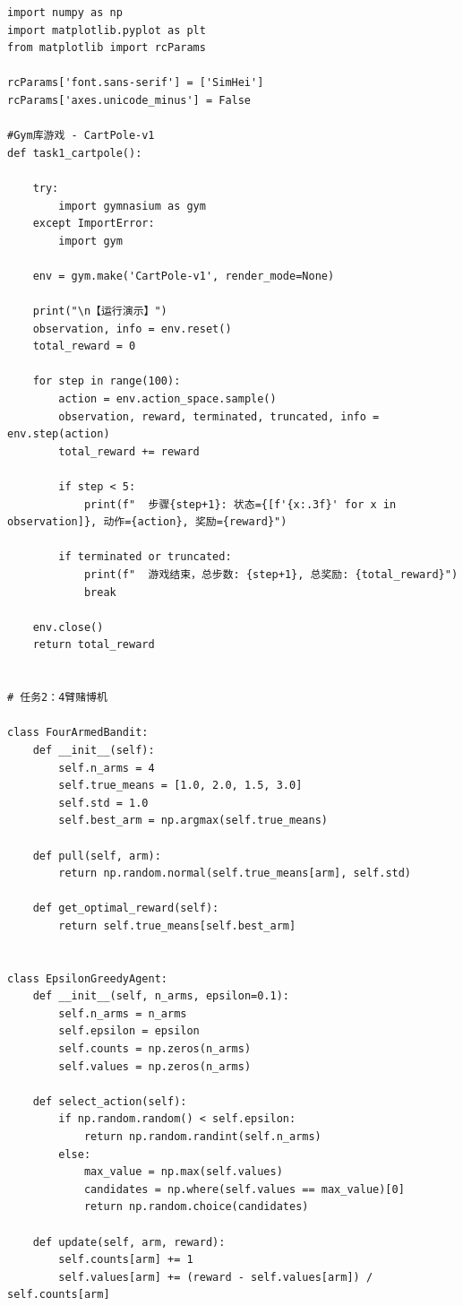 \documentclass[12pt,a4paper]{article}
\begin{document}
\begin{lstlisting}[caption={强化学习实验完整代码}]
import numpy as np
import matplotlib.pyplot as plt
from matplotlib import rcParams

rcParams['font.sans-serif'] = ['SimHei']
rcParams['axes.unicode_minus'] = False

#Gym库游戏 - CartPole-v1
def task1_cartpole():

    try:
        import gymnasium as gym
    except ImportError:
        import gym
    
    env = gym.make('CartPole-v1', render_mode=None)
   
    print("\n【运行演示】")
    observation, info = env.reset()
    total_reward = 0
    
    for step in range(100):
        action = env.action_space.sample()
        observation, reward, terminated, truncated, info = env.step(action)
        total_reward += reward
        
        if step < 5:
            print(f"  步骤{step+1}: 状态={[f'{x:.3f}' for x in observation]}, 动作={action}, 奖励={reward}")
        
        if terminated or truncated:
            print(f"  游戏结束，总步数: {step+1}, 总奖励: {total_reward}")
            break
    
    env.close()
    return total_reward


# 任务2：4臂赌博机

class FourArmedBandit:
    def __init__(self):
        self.n_arms = 4
        self.true_means = [1.0, 2.0, 1.5, 3.0]
        self.std = 1.0
        self.best_arm = np.argmax(self.true_means)
    
    def pull(self, arm):
        return np.random.normal(self.true_means[arm], self.std)
    
    def get_optimal_reward(self):
        return self.true_means[self.best_arm]


class EpsilonGreedyAgent:
    def __init__(self, n_arms, epsilon=0.1):
        self.n_arms = n_arms
        self.epsilon = epsilon
        self.counts = np.zeros(n_arms)
        self.values = np.zeros(n_arms)
    
    def select_action(self):
        if np.random.random() < self.epsilon:
            return np.random.randint(self.n_arms)
        else:
            max_value = np.max(self.values)
            candidates = np.where(self.values == max_value)[0]
            return np.random.choice(candidates)
    
    def update(self, arm, reward):
        self.counts[arm] += 1
        self.values[arm] += (reward - self.values[arm]) / self.counts[arm]



\end{lstlisting}
\end{document}
